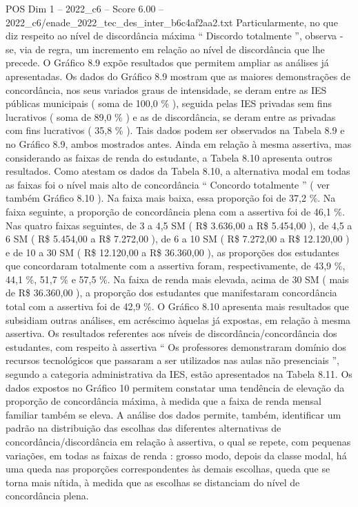\begin{textsample}{POS Dim 1 – 2022\_c6 – Score 6.00 – 2022\_c6/enade\_2022\_tec\_des\_inter\_b6c4af2aa2.txt}
Particularmente, no que diz respeito ao nível de discordância máxima “ Discordo totalmente ”, observa -se, via de regra, um incremento em relação ao nível de discordância que lhe precede.
O Gráfico 8.9 expõe resultados que permitem ampliar as análises já apresentadas.
Os dados do Gráfico 8.9 mostram que as maiores demonstrações de concordância, nos seus variados graus de intensidade, se deram entre as IES públicas municipais ( soma de 100,0 \% ), seguida pelas IES privadas sem fins lucrativos ( soma de 89,0 \% ) e as de discordância, se deram entre as privadas com fins lucrativos ( 35,8 \% ).
Tais dados podem ser observados na Tabela 8.9 e no Gráfico 8.9, ambos mostrados antes.
Ainda em relação à mesma assertiva, mas considerando as faixas de renda do estudante, a Tabela 8.10 apresenta outros resultados.
Como atestam os dados da Tabela 8.10, a alternativa modal em todas as faixas foi o nível mais alto de concordância “ Concordo totalmente ” ( ver também Gráfico 8.10 ).
Na faixa mais baixa, essa proporção foi de 37,2 \%.
Na faixa seguinte, a proporção de concordância plena com a assertiva foi de 46,1 \%.
Nas quatro faixas seguintes, de 3 a 4,5 SM ( R\$ 3.636,00 a R\$ 5.454,00 ), de 4,5 a 6 SM ( R\$ 5.454,00 a R\$ 7.272,00 ), de 6 a 10 SM ( R\$ 7.272,00 a R\$ 12.120,00 ) e de 10 a 30 SM ( R\$ 12.120,00 a R\$ 36.360,00 ), as proporções dos estudantes que concordaram totalmente com a assertiva foram, respectivamente, de 43,9 \%, 44,1 \%, 51,7 \% e 57,5 \%.
Na faixa de renda mais elevada, acima de 30 SM ( mais de R\$ 36.360,00 ), a proporção dos estudantes que manifestaram concordância total com a assertiva foi de 42,9 \%.
O Gráfico 8.10 apresenta mais resultados que subsidiam outras análises, em acréscimo àquelas já expostas, em relação à mesma assertiva.
Os resultados referentes aos níveis de discordância/concordância dos estudantes, com respeito à assertiva “ Os professores demonstraram domínio dos recursos tecnológicos que passaram a ser utilizados nas aulas não presenciais ”, segundo a categoria administrativa da IES, estão apresentados na Tabela 8.11.
Os dados expostos no Gráfico 10 permitem constatar uma tendência de elevação da proporção de concordância máxima, à medida que a faixa de renda mensal familiar também se eleva.
A análise dos dados permite, também, identificar um padrão na distribuição das escolhas das diferentes alternativas de concordância/discordância em relação à assertiva, o qual se repete, com pequenas variações, em todas as faixas de renda : grosso modo, depois da classe modal, há uma queda nas proporções correspondentes às demais escolhas, queda que se torna mais nítida, à medida que as escolhas se distanciam do nível de concordância plena.

\end{textsample}
